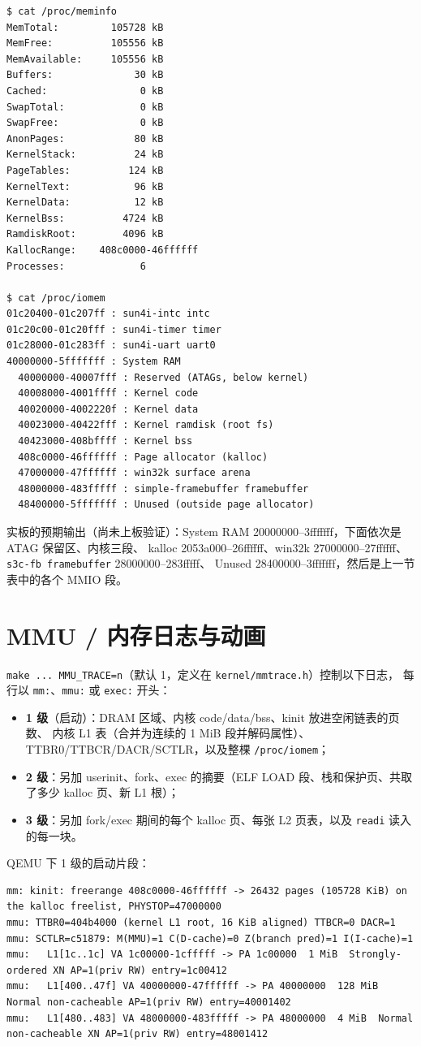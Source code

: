 \begin{lstlisting}
$ cat /proc/meminfo
MemTotal:         105728 kB
MemFree:          105556 kB
MemAvailable:     105556 kB
Buffers:              30 kB
Cached:                0 kB
SwapTotal:             0 kB
SwapFree:              0 kB
AnonPages:            80 kB
KernelStack:          24 kB
PageTables:          124 kB
KernelText:           96 kB
KernelData:           12 kB
KernelBss:          4724 kB
RamdiskRoot:        4096 kB
KallocRange:    408c0000-46ffffff
Processes:             6

$ cat /proc/iomem
01c20400-01c207ff : sun4i-intc intc
01c20c00-01c20fff : sun4i-timer timer
01c28000-01c283ff : sun4i-uart uart0
40000000-5fffffff : System RAM
  40000000-40007fff : Reserved (ATAGs, below kernel)
  40008000-4001ffff : Kernel code
  40020000-4002220f : Kernel data
  40023000-40422fff : Kernel ramdisk (root fs)
  40423000-408bffff : Kernel bss
  408c0000-46ffffff : Page allocator (kalloc)
  47000000-47ffffff : win32k surface arena
  48000000-483fffff : simple-framebuffer framebuffer
  48400000-5fffffff : Unused (outside page allocator)
\end{lstlisting}

实板的预期输出（尚未上板验证）：System RAM 20000000--3fffffff，下面依次是 ATAG 保留区、内核三段、
kalloc 2053a000--26ffffff、win32k 27000000--27ffffff、\texttt{s3c-fb framebuffer} 28000000--283fffff、
Unused 28400000--3fffffff，然后是上一节表中的各个 MMIO 段。

\section{MMU / 内存日志与动画}

\texttt{make ... MMU\_TRACE=n}（默认 1，定义在 \texttt{kernel/mmtrace.h}）控制以下日志，
每行以 \texttt{mm:}、\texttt{mmu:} 或 \texttt{exec:} 开头：
\begin{itemize}
\item \textbf{1 级}（启动）：DRAM 区域、内核 code/data/bss、kinit 放进空闲链表的页数、
      内核 L1 表（合并为连续的 1 MiB 段并解码属性）、TTBR0/TTBCR/DACR/SCTLR，以及整棵 \texttt{/proc/iomem}；
\item \textbf{2 级}：另加 userinit、fork、exec 的摘要（ELF LOAD 段、栈和保护页、共取了多少 kalloc 页、新 L1 根）；
\item \textbf{3 级}：另加 fork/exec 期间的每个 kalloc 页、每张 L2 页表，以及 \texttt{readi} 读入的每一块。
\end{itemize}

QEMU 下 1 级的启动片段：
\begin{lstlisting}
mm: kinit: freerange 408c0000-46ffffff -> 26432 pages (105728 KiB) on the kalloc freelist, PHYSTOP=47000000
mmu: TTBR0=404b4000 (kernel L1 root, 16 KiB aligned) TTBCR=0 DACR=1
mmu: SCTLR=c51879: M(MMU)=1 C(D-cache)=0 Z(branch pred)=1 I(I-cache)=1
mmu:   L1[1c..1c] VA 1c00000-1cfffff -> PA 1c00000  1 MiB  Strongly-ordered XN AP=1(priv RW) entry=1c00412
mmu:   L1[400..47f] VA 40000000-47ffffff -> PA 40000000  128 MiB  Normal non-cacheable AP=1(priv RW) entry=40001402
mmu:   L1[480..483] VA 48000000-483fffff -> PA 48000000  4 MiB  Normal non-cacheable XN AP=1(priv RW) entry=48001412
\end{lstlisting}

